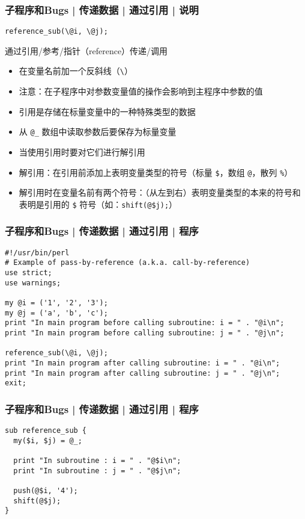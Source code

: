\begin{frame}[fragile]
  \frametitle{子程序和Bugs | 传递数据 | 通过引用 | \alert{说明}}
\begin{lstlisting}
reference_sub(\@i, \@j);
\end{lstlisting}
\begin{block}{通过引用/参考/指针（reference）传递/调用}
  \begin{itemize}
    \item 在变量名前加一个反斜线（\verb|\|）
    \item 注意：在子程序中对参数变量值的操作会影响到主程序中参数的值
    \item 引用是存储在标量变量中的一种特殊类型的数据
    \item 从 \verb|@_| 数组中读取参数后要保存为标量变量
    \item 当使用引用时要对它们进行解引用
    \item 解引用：在引用前添加上表明变量类型的符号（标量 \verb|$|，数组 \verb|@|，散列 \verb|%|）
    \item 解引用时在变量名前有两个符号：（从左到右）表明变量类型的本来的符号和表明是引用的 \verb|$| 符号（如：\verb|shift(@$j);|）
  \end{itemize}
\end{block}
\end{frame}

\begin{frame}[fragile]
  \frametitle{子程序和Bugs | 传递数据 | 通过引用 | 程序}
\begin{lstlisting}[basicstyle=\footnotesize\tt]
#!/usr/bin/perl
# Example of pass-by-reference (a.k.a. call-by-reference)
use strict;
use warnings;

my @i = ('1', '2', '3');
my @j = ('a', 'b', 'c');
print "In main program before calling subroutine: i = " . "@i\n";
print "In main program before calling subroutine: j = " . "@j\n";

reference_sub(\@i, \@j);
print "In main program after calling subroutine: i = " . "@i\n";
print "In main program after calling subroutine: j = " . "@j\n";
exit;
\end{lstlisting}
\end{frame}

\begin{frame}[fragile]
  \frametitle{子程序和Bugs | 传递数据 | 通过引用 | 程序}
\begin{lstlisting}
sub reference_sub {
  my($i, $j) = @_;

  print "In subroutine : i = " . "@$i\n";
  print "In subroutine : j = " . "@$j\n";

  push(@$i, '4');
  shift(@$j);
}
\end{lstlisting}
\end{frame}

